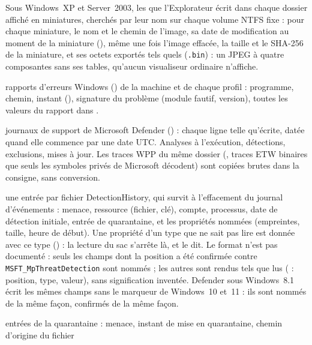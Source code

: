 \documentclass[11pt,a4paper,oneside]{report}
\begin{document}
\begin{description}[style=nextline,leftmargin=1.2em]
        Sous Windows~XP et Server~2003, les  que
        l'Explorateur écrit dans chaque dossier affiché en miniatures,
        cherchés par leur nom sur chaque volume NTFS fixe : pour chaque
        miniature, le nom et le chemin de l'image, sa date de modification
        au moment de la miniature (), même une fois
        l'image effacée, la taille et le SHA-256 de la miniature, et ses
        octets exportés tels quels (\texttt{.bin}) : un JPEG à quatre
        composantes sans ses tables, qu'aucun visualiseur ordinaire n'affiche.
  \item[\fichier{error\_reports.json}] rapports d'erreurs Windows
        () de la machine et de chaque profil : programme,
        chemin, instant (), signature du problème
        (module fautif, version), toutes les valeurs du rapport dans
        .
  \item[\fichier{defender\_log.json}] journaux de support de Microsoft Defender
        () : chaque ligne telle qu'écrite, datée quand elle
        commence par une date UTC. Analyses à l'exécution, détections,
        exclusions, mises à jour. Les traces WPP du même dossier
        (, traces ETW binaires que seuls les symboles
        privés de Microsoft décodent) sont copiées brutes dans la consigne, sans
        conversion.
  \item[\fichier{defender\_detections.json}] une entrée par fichier
        DetectionHistory, qui survit à l'effacement du journal d'événements :
        menace, ressource (fichier, clé), compte, processus, date de détection
        initiale, entrée de quarantaine, et les propriétés nommées
         (empreintes, taille, heure de début). Une
        propriété d'un type que \wac{} ne sait pas lire est donnée avec ce type
        () : la lecture du sac s'arrête là, et le dit. Le format
        n'est pas documenté : seuls les champs dont la position a été confirmée
        contre \texttt{MSFT\_MpThreatDetection} sont nommés ; les autres sont
        rendus tels que lus ( : position, type, valeur),
        sans signification inventée. Defender sous Windows~8.1 écrit les mêmes
        champs sans le marqueur  de Windows~10 et~11 : ils
        sont nommés de la même façon, confirmés de la même façon.
  \item[\fichier{defender\_quarantine.json}] entrées de la quarantaine :
        menace, instant de mise en quarantaine, chemin d'origine du fichier

\end{description}
\end{document}
